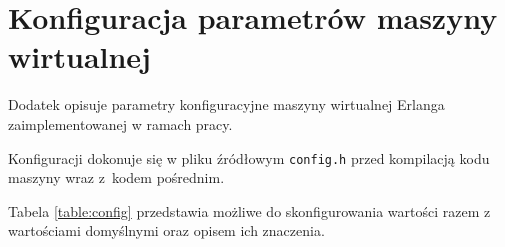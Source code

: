 \chapter{Konfiguracja parametrów maszyny wirtualnej}
\label{cha:config}

Dodatek opisuje parametry konfiguracyjne maszyny wirtualnej Erlanga zaimplementowanej w ramach pracy.

Konfiguracji dokonuje się w pliku źródłowym \texttt{config.h} przed kompilacją kodu maszyny wraz z~kodem pośrednim.

Tabela \ref{table:config} przedstawia możliwe do skonfigurowania wartości razem z wartościami domyślnymi oraz opisem ich znaczenia.

\begin{longtable}{|c|c|p{8cm}|}
\hline


\end{longtable}
